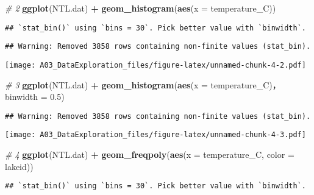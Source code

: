 \documentclass[]{article}
\newenvironment{Shaded}{\begin{snugshade}}{\end{snugshade}}
\newcommand{\KeywordTok}[1]{\textcolor[rgb]{0.13,0.29,0.53}{\textbf{#1}}}
\newcommand{\DataTypeTok}[1]{\textcolor[rgb]{0.13,0.29,0.53}{#1}}
\newcommand{\FloatTok}[1]{\textcolor[rgb]{0.00,0.00,0.81}{#1}}
\newcommand{\StringTok}[1]{\textcolor[rgb]{0.31,0.60,0.02}{#1}}
\newcommand{\CommentTok}[1]{\textcolor[rgb]{0.56,0.35,0.01}{\textit{#1}}}
\newcommand{\OperatorTok}[1]{\textcolor[rgb]{0.81,0.36,0.00}{\textbf{#1}}}
\newcommand{\NormalTok}[1]{#1}
\begin{document}
\begin{Shaded}
\begin{Highlighting}[]
\CommentTok{# 2}
\KeywordTok{ggplot}\NormalTok{(NTL.dat) }\OperatorTok{+}
\StringTok{  }\KeywordTok{geom_histogram}\NormalTok{(}\KeywordTok{aes}\NormalTok{(}\DataTypeTok{x =}\NormalTok{ temperature_C))}
\end{Highlighting}
\end{Shaded}

\begin{verbatim}
## `stat_bin()` using `bins = 30`. Pick better value with `binwidth`.
\end{verbatim}

\begin{verbatim}
## Warning: Removed 3858 rows containing non-finite values (stat_bin).
\end{verbatim}

\texttt{[image: A03\_DataExploration\_files/figure-latex/unnamed-chunk-4-2.pdf]}

\begin{Shaded}
\begin{Highlighting}[]
\CommentTok{# 3}
\KeywordTok{ggplot}\NormalTok{(NTL.dat) }\OperatorTok{+}
\StringTok{  }\KeywordTok{geom_histogram}\NormalTok{(}\KeywordTok{aes}\NormalTok{(}\DataTypeTok{x =}\NormalTok{ temperature_C)，}\DataTypeTok{binwidth =} \FloatTok{0.5}\NormalTok{)}
\end{Highlighting}
\end{Shaded}

\begin{verbatim}
## Warning: Removed 3858 rows containing non-finite values (stat_bin).
\end{verbatim}

\texttt{[image: A03\_DataExploration\_files/figure-latex/unnamed-chunk-4-3.pdf]}

\begin{Shaded}
\begin{Highlighting}[]
\CommentTok{# 4}
\KeywordTok{ggplot}\NormalTok{(NTL.dat) }\OperatorTok{+}
\StringTok{  }\KeywordTok{geom_freqpoly}\NormalTok{(}\KeywordTok{aes}\NormalTok{(}\DataTypeTok{x =}\NormalTok{ temperature_C, }\DataTypeTok{color =}\NormalTok{ lakeid))}
\end{Highlighting}
\end{Shaded}

\begin{verbatim}
## `stat_bin()` using `bins = 30`. Pick better value with `binwidth`.
\end{verbatim}
\end{document}
